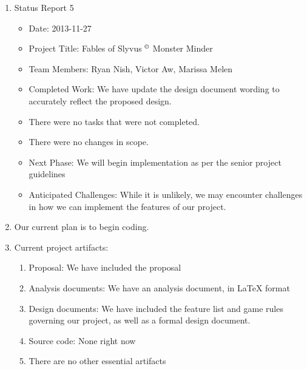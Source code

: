 \documentclass[letterpaper,12pt]{letter}
\begin{document}
\begin{enumerate}
\item Status Report 5
\begin{itemize}
\item Date: 2013-11-27
\item Project Title: Fables of Slyvus $^{\small \copyright}$ Monster Minder
\item Team Members: Ryan Nish, Victor Aw, Marissa Melen
\item Completed Work: We have update the design document wording to
  accurately reflect the proposed design.
\item There were no tasks that were not completed.
\item There were no changes in scope.
\item Next Phase: We will begin implementation as per the senior
  project guidelines
\item Anticipated Challenges: While it is unlikely, we may encounter
  challenges in how we can implement the features of our project.
\end{itemize}
\item Our current plan is to begin coding.
\item Current project artifacts:
\begin{enumerate}
\item Proposal: We have included the proposal 
\item Analysis documents: We have an analysis document, in LaTeX format
\item Design documents: We have included the feature list and game
  rules governing our project, as well as a formal design document.
\item Source code: None right now
\item There are no other essential artifacts
\end{enumerate}
\end{enumerate}
\end{document}
